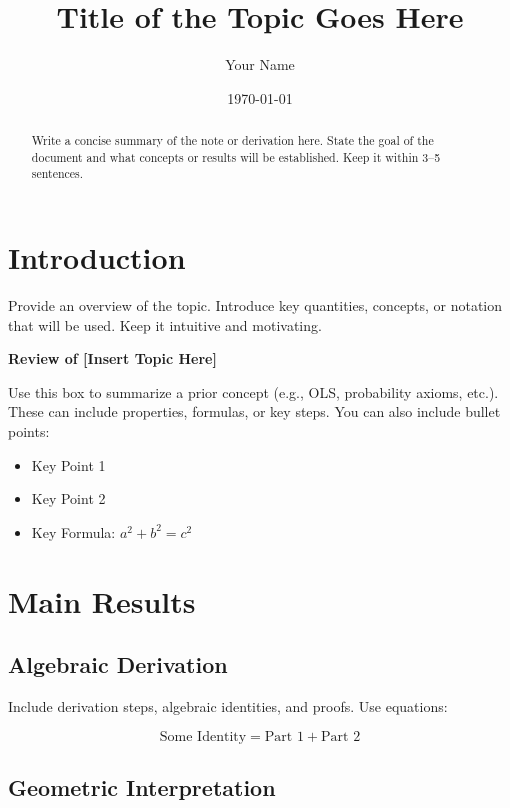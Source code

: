 \documentclass[12pt]{article}
\title{\textbf{\LARGE Title of the Topic Goes Here}}
\author{\Large Your Name}
\date{\today} %
\begin{document}
\maketitle

\begin{abstract}
\noindent
Write a concise summary of the note or derivation here. State the goal of the document and what concepts or results will be established. Keep it within 3–5 sentences.
\end{abstract}

\section{Introduction}

Provide an overview of the topic. Introduce key quantities, concepts, or notation that will be used. Keep it intuitive and motivating.

\begin{center}
\begin{framed}
\noindent\textbf{Review of [Insert Topic Here]} 

\vspace{0.5em}
Use this box to summarize a prior concept (e.g., OLS, probability axioms, etc.). These can include properties, formulas, or key steps. You can also include bullet points:

\begin{itemize}
    \item Key Point 1
    \item Key Point 2
    \item Key Formula: \( a^2 + b^2 = c^2 \)
\end{itemize}
\end{framed}
\end{center}

\section{Main Results}

\subsection{Algebraic Derivation}

Include derivation steps, algebraic identities, and proofs. Use equations:

\[
\text{Some Identity} = \text{Part 1} + \text{Part 2}
\]

\subsection{Geometric Interpretation}
\end{document}
